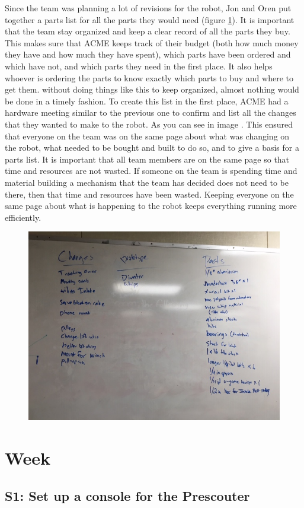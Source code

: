\documentclass{article}
\begin{document}
Since the team was planning a lot of revisions for the robot, Jon and Oren put together a parts list for all the parts they would need (figure \ref{fig: Parts list}). It is important that the team stay organized and keep a clear record of all the parts they buy. This makes sure that ACME keeps track of their budget (both how much money they have and how much they have spent), which parts have been ordered and which have not, and which parts they need in the first place. It also helps whoever is ordering the parts to know exactly which parts to buy and where to get them. without doing things like this to keep organized, almost nothing would be done in a timely fashion. To create this list in the first place, ACME had a hardware meeting similar to the previous one to confirm and list all the changes that they wanted to make to the robot. As you can see in image . This ensured that everyone on the team was on the same page about what was changing on the robot, what needed to be bought and built to do so, and to give a basis for a parts list. It is important that all team members are on the same page so that time and resources are not wasted. If someone on the team is spending time and material building a mechanism that the team has decided does not need to be there, then that time and resources have been wasted. Keeping everyone on the same page about what is happening to the robot keeps everything running more efficiently.

\begin{figure}
    \centering
    \includegraphics[width=.6 \textwidth]{14_12-03/images/IMG_0422.JPG}
    \caption{}
    \label{fig: Parts list}
\end{figure}
\clearpage \newpage \section{Week \thesection} 
\subsection{S1: Set up a console for the Prescouter}
\end{document}
